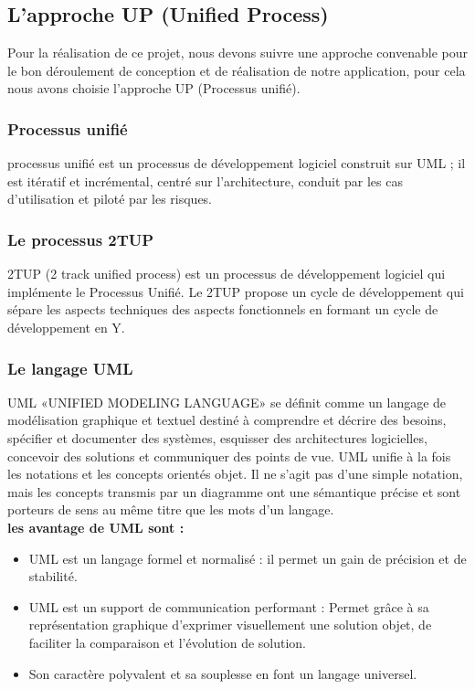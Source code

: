 \subsection{L’approche UP (Unified Process) }
\par Pour la réalisation de ce projet, nous devons suivre une approche
convenable pour le bon déroulement de conception et de réalisation de notre
application, pour cela nous avons choisie l’approche UP (Processus unifié).
\subsubsection{Processus unifié }
\parUn processus unifié est un processus de développement logiciel construit
sur UML ; il est itératif et incrémental, centré sur l’architecture, conduit
par les cas d’utilisation et piloté par les risques.\cite{ref2}
\subsubsection{Le processus 2TUP }
\par 2TUP (2 track unified process) est un processus de développement logiciel
qui implémente le Processus Unifié. Le 2TUP propose un cycle de développement
qui sépare les aspects techniques des aspects fonctionnels en formant un cycle
de développement en Y.\cite{ref2}
\subsubsection{Le langage UML }
\par UML «UNIFIED MODELING LANGUAGE» se définit comme un langage de
modélisation graphique et textuel destiné à comprendre et décrire des besoins,
spécifier et documenter des systèmes, esquisser des architectures logicielles,
concevoir des solutions et communiquer des points de vue. UML unifie à la fois
les notations et les concepts orientés objet. Il ne s’agit pas d’une simple
notation, mais les concepts transmis par un diagramme ont une sémantique
précise et sont porteurs de sens au même titre que les mots d’un
langage.\cite{ref2}\\
\textbf{les avantage  de UML sont :}
\begin{itemize}[label=\textbullet]
\item UML est un langage formel et normalisé : il permet un gain de précision
et de stabilité.
\item UML est un support de communication performant :
Permet grâce à sa représentation graphique d'exprimer visuellement une solution
objet, de faciliter la comparaison et l'évolution de solution.
\item Son caractère polyvalent et sa souplesse en font un langage universel.
\end{itemize}
